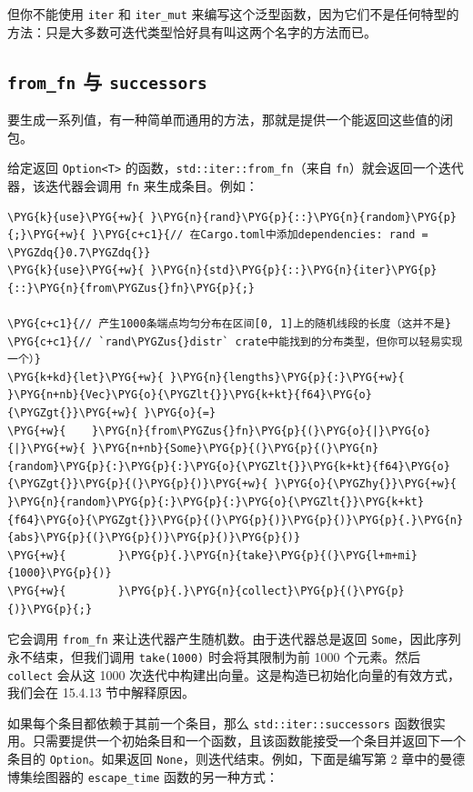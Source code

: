但你不能使用 \texttt{iter} 和 \texttt{iter\_mut} 来编写这个泛型函数，因为它们不是任何特型的方法：只是大多数可迭代类型恰好具有叫这两个名字的方法而已。

\subsection{\texttt{from\_fn} 与 \texttt{successors}}

要生成一系列值，有一种简单而通用的方法，那就是提供一个能返回这些值的闭包。

给定返回 \texttt{Option<T>} 的函数，\texttt{std::iter::from\_fn}（来自 \texttt{fn}）就会返回一个迭代器，该迭代器会调用 \texttt{fn} 来生成条目。例如：

\begin{Verbatim}[commandchars=\\\{\},breaklines=true,breakanywhere=true,fontsize=\codefont,xleftmargin=17bp]
\PYG{k}{use}\PYG{+w}{ }\PYG{n}{rand}\PYG{p}{::}\PYG{n}{random}\PYG{p}{;}\PYG{+w}{ }\PYG{c+c1}{// 在Cargo.toml中添加dependencies: rand = \PYGZdq{}0.7\PYGZdq{}}
\PYG{k}{use}\PYG{+w}{ }\PYG{n}{std}\PYG{p}{::}\PYG{n}{iter}\PYG{p}{::}\PYG{n}{from\PYGZus{}fn}\PYG{p}{;}

\PYG{c+c1}{// 产生1000条端点均匀分布在区间[0, 1]上的随机线段的长度（这并不是}
\PYG{c+c1}{// `rand\PYGZus{}distr` crate中能找到的分布类型，但你可以轻易实现一个）}
\PYG{k+kd}{let}\PYG{+w}{ }\PYG{n}{lengths}\PYG{p}{:}\PYG{+w}{ }\PYG{n+nb}{Vec}\PYG{o}{\PYGZlt{}}\PYG{k+kt}{f64}\PYG{o}{\PYGZgt{}}\PYG{+w}{ }\PYG{o}{=}
\PYG{+w}{    }\PYG{n}{from\PYGZus{}fn}\PYG{p}{(}\PYG{o}{|}\PYG{o}{|}\PYG{+w}{ }\PYG{n+nb}{Some}\PYG{p}{(}\PYG{p}{(}\PYG{n}{random}\PYG{p}{:}\PYG{p}{:}\PYG{o}{\PYGZlt{}}\PYG{k+kt}{f64}\PYG{o}{\PYGZgt{}}\PYG{p}{(}\PYG{p}{)}\PYG{+w}{ }\PYG{o}{\PYGZhy{}}\PYG{+w}{ }\PYG{n}{random}\PYG{p}{:}\PYG{p}{:}\PYG{o}{\PYGZlt{}}\PYG{k+kt}{f64}\PYG{o}{\PYGZgt{}}\PYG{p}{(}\PYG{p}{)}\PYG{p}{)}\PYG{p}{.}\PYG{n}{abs}\PYG{p}{(}\PYG{p}{)}\PYG{p}{)}\PYG{p}{)}
\PYG{+w}{        }\PYG{p}{.}\PYG{n}{take}\PYG{p}{(}\PYG{l+m+mi}{1000}\PYG{p}{)}
\PYG{+w}{        }\PYG{p}{.}\PYG{n}{collect}\PYG{p}{(}\PYG{p}{)}\PYG{p}{;}
\end{Verbatim}

它会调用 \texttt{from\_fn} 来让迭代器产生随机数。由于迭代器总是返回 \texttt{Some}，因此序列永不结束，但我们调用 \texttt{take(1000)} 时会将其限制为前 1000 个元素。然后 \texttt{collect} 会从这 1000 次迭代中构建出向量。这是构造已初始化向量的有效方式，我们会在 15.4.13 节中解释原因。

如果每个条目都依赖于其前一个条目，那么 \texttt{std::iter::successors} 函数很实用。只需要提供一个初始条目和一个函数，且该函数能接受一个条目并返回下一个条目的 \texttt{Option}。如果返回 \texttt{None}，则迭代结束。例如，下面是编写第 2 章中的曼德博集绘图器的 \texttt{escape\_time} 函数的另一种方式：

